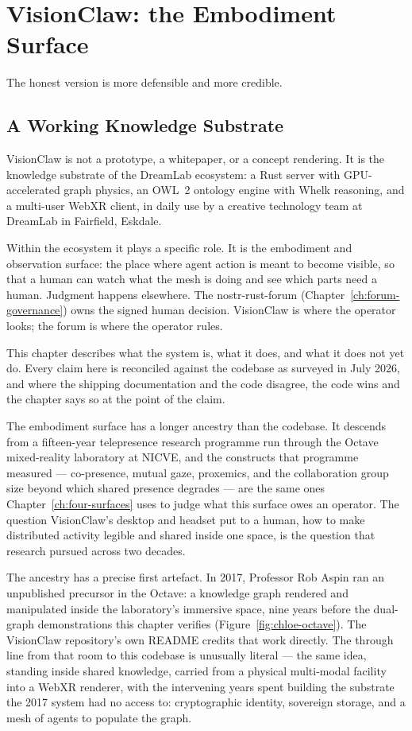 \chapter{VisionClaw: the Embodiment Surface}
\label{ch:technical-substrate}

\epigraph{The honest version is more defensible and more credible.}{}

\section{A Working Knowledge Substrate}

VisionClaw is not a prototype, a whitepaper, or a concept rendering. It is the knowledge substrate of the DreamLab ecosystem: a Rust server with GPU-accelerated graph physics, an OWL~2 ontology engine with Whelk reasoning, and a multi-user WebXR client, in daily use by a creative technology team at DreamLab in Fairfield, Eskdale.

Within the ecosystem it plays a specific role. It is the embodiment and observation surface: the place where agent action is meant to become visible, so that a human can watch what the mesh is doing and see which parts need a human. Judgment happens elsewhere. The nostr-rust-forum (Chapter~\ref{ch:forum-governance}) owns the signed human decision. VisionClaw is where the operator looks; the forum is where the operator rules.

This chapter describes what the system is, what it does, and what it does not yet do. Every claim here is reconciled against the codebase as surveyed in July 2026, and where the shipping documentation and the code disagree, the code wins and the chapter says so at the point of the claim.

The embodiment surface has a longer ancestry than the codebase. It descends from a fifteen-year telepresence research programme run through the Octave mixed-reality laboratory at NICVE, and the constructs that programme measured --- co-presence, mutual gaze, proxemics, and the collaboration group size beyond which shared presence degrades --- are the same ones Chapter~\ref{ch:four-surfaces} uses to judge what this surface owes an operator. The question VisionClaw's desktop and headset put to a human, how to make distributed activity legible and shared inside one space, is the question that research pursued across two decades.

The ancestry has a precise first artefact. In 2017, Professor Rob Aspin ran an unpublished precursor in the Octave: a knowledge graph rendered and manipulated inside the laboratory's immersive space, nine years before the dual-graph demonstrations this chapter verifies (Figure~\ref{fig:chloe-octave}). The VisionClaw repository's own README credits that work directly. The through line from that room to this codebase is unusually literal --- the same idea, standing inside shared knowledge, carried from a physical multi-modal facility into a WebXR renderer, with the intervening years spent building the substrate the 2017 system had no access to: cryptographic identity, sovereign storage, and a mesh of agents to populate the graph.

